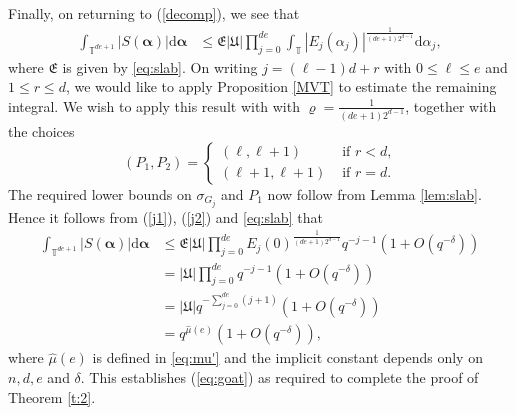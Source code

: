 \documentclass[12pt, reqno]{amsart}
\numberwithin{equation}{section}
\renewcommand{\d}{\mathrm{d}}
\renewcommand{\rho}{\varrho}
\newcommand{\0}{\mathbf{0}}
\newcommand{\TT}{\mathbb{T}}
\renewcommand{\leq}{\leqslant}
\newcommand{\bal}{\boldsymbol{\alpha}}
\renewcommand{\=}{\equiv}
\newcommand{\1}{\mathbf{1}}
\theoremstyle{definition}
\begin{document}
Finally, on returning to   (\ref{decomp}), we see that 
\begin{align*}
\int_{\TT^{de+1}} |S(\bal)| \d \bal
&\leq
\mathfrak{E} |\mathfrak{U}| \prod_{j=0}^{de}  \int_{\TT} |E_j(\alpha_j)|^{ \frac{1}{ (de + 1) 2^{d-1} } } \d \alpha_j,
\end{align*}
where 
$\mathfrak{E}$ is given by 
\eqref{eq:slab}.
On  writing $j=(\ell - 1) d + r $ with $0 \leq \ell \leq e$ and  $1 \leq r \leq d$, 
we would like to apply  Proposition \ref{MVT} 
to estimate the remaining integral. We wish to apply this result with
with $\rho=\frac{1}{(de+1)2^{d-1}}$, together with the choices 
$$
(P_1,P_2)=
\begin{cases}
(\ell,\ell+1) & \text{ if $r<d$,}\\
(\ell+1,\ell+1) & \text{ if $r=d$.}
\end{cases}
$$
The required  lower bounds on $\sigma_{G_j}$ and $P_1$ now  follow from 
Lemma \ref{lem:slab}.
Hence it follows from (\ref{j1}), (\ref{j2}) and 
\eqref{eq:slab}
that
\begin{align*}
\int_{\TT^{de+1}} |S(\bal)| \d \bal
&\leq
\mathfrak{E} |\mathfrak{U}|
\prod_{ j = 0 }^{de}  E_{j}(0)^{ \frac{1}{ (de + 1) 2^{d-1} } }  q^{- j - 1 } (1 + O( q^{- \delta} ))
\\
&=
|\mathfrak{U}|
\prod_{ j = 0 }^{de}  q^{ - j - 1 } (1 + O( q^{- \delta} ))
\\
&=
|\mathfrak{U}| q^{  -  \sum_{j = 0}^{de} (j + 1) } (1 + O( q^{- \delta} ))
\\
&=
q^{ \widehat{\mu}(e) }  (1 + O( q^{- \delta} )),
\end{align*}
where 
$\widehat{\mu}(e)$ is defined in  \eqref{eq:mu'} and
the implicit constant depends only on $n, d, e$ and $\delta$.
This establishes (\ref{eq:goat}) as required to complete the proof of Theorem \ref{t:2}.
\end{document}

